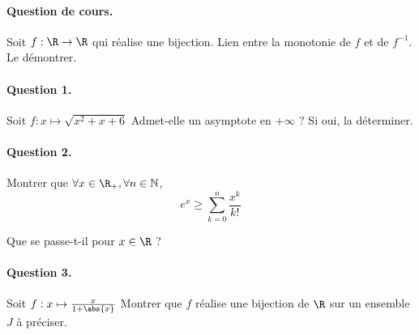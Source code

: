 \documentclass[12pt]{article}
\date{today{}}
\begin{document}
\paragraph{Question de cours.}
Soit $f : \R \to \R$ qui réalise une bijection.
Lien entre la monotonie de $f$ et de $f^{-1}$. Le démontrer.

\paragraph{Question 1.} 
Soit $f : x \mapsto \sqrt{x^2 + x + 6}$
Admet-elle un asymptote en $+\infty$ ? Si oui, la déterminer.

\paragraph{Question 2.}
Montrer que $\forall x \in \R_{+}, \forall n \in \mathbb{N}$, $$
    e^x \ge \sum_{k=0}^{n} \frac{x^k}{k!}
$$

Que se passe-t-il pour $x \in \R$ ?

\paragraph{Question 3.} 
Soit $f : x \mapsto \frac{x}{1 + \abs{x}}$
Montrer que $f$ réalise une bijection de $\R$ sur un ensemble
$J$ à préciser.
\end{document}

